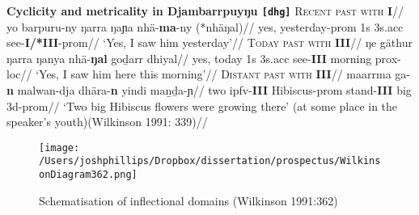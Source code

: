 \documentclass[10pt]{article}
\begin{document}
\pex \textbf{Cyclicity and metricality in Djambarrpuyŋu \texttt{[dhg]}}
\a{}\begingl\glpreamble\textsc{Recent past with \textbf{I}}//
\gla yo barpuru-ny ŋarra ŋaɲa nhä-\textbf{ma}-ny (*nhäŋal)//
\glb	yes, yesterday{\sc-prom} 1s 3s{\sc.acc} see-\textbf{I/*III}-{\sc prom}//
\glft`Yes, I saw him yesterday'\footnotemark//\endgl
\a\begingl\glpreamble\textsc{Today past with \textbf{III}}//
\gla ŋe gäthur ŋarra ŋanya nhä-\textbf{ŋal} goḏarr dhiyal//
\glb	yes, today 1s 3s{\sc.acc} see-\textbf{III} morning {\sc prox-loc}//
\glft`Yes, I saw him here this morning'//\endgl
\a\begingl\glpreamble\textsc{Distant past with \textbf{III}}//
\gla maarrma ga-\textbf{n} malwan-dja dhära-\textbf{n} yindi maṉḏa-ɲ//
\glb two {\sc ipfv-\textbf{III}} Hibiscus-{\sc prom} stand-\textbf{III} big 3d-{\sc prom}//
\glft`Two big Hibiscus flowers were growing there' (at some place in the speaker's youth)\hfill(Wilkinson 1991: 339)//
\endgl
\xe


\begin{figure}[h!]
\caption{Schematisation of inflectional domains (Wilkinson 1991:362)}

\texttt{[image: /Users/joshphillips/Dropbox/dissertation/prospectus/WilkinsonDiagram362.png]}

\end{figure}
\end{document}
